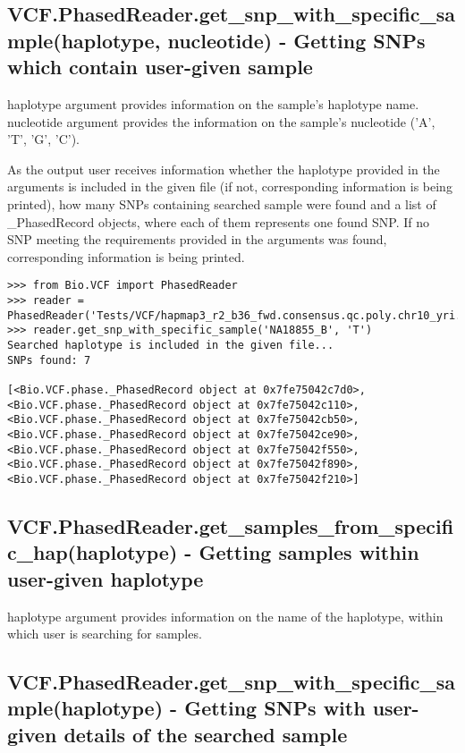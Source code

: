 \subsection{VCF.PhasedReader.get\_snp\_with\_specific\_sample(haplotype, nucleotide) - Getting SNPs which contain user-given sample}

\noindent haplotype argument provides information on the sample's haplotype name.
nucleotide argument provides the information on the sample's nucleotide ('A', 'T', 'G', 'C'). 

\noindent As the output user receives information whether the haplotype provided in the arguments is included in the given file (if not, corresponding information 
is being printed), how many SNPs containing searched sample were found and a list of \_PhasedRecord objects, where each of them represents one found SNP. If no SNP
meeting the requirements provided in the arguments was found, corresponding information is being printed. 

\begin{verbatim}
>>> from Bio.VCF import PhasedReader
>>> reader = PhasedReader('Tests/VCF/hapmap3_r2_b36_fwd.consensus.qc.poly.chr10_yri.D.phased')
>>> reader.get_snp_with_specific_sample('NA18855_B', 'T')
Searched haplotype is included in the given file...
SNPs found: 7

[<Bio.VCF.phase._PhasedRecord object at 0x7fe75042c7d0>, <Bio.VCF.phase._PhasedRecord object at 0x7fe75042c110>, <Bio.VCF.phase._PhasedRecord object at 0x7fe75042cb50>, <Bio.VCF.phase._PhasedRecord object at 0x7fe75042ce90>, <Bio.VCF.phase._PhasedRecord object at 0x7fe75042f550>, <Bio.VCF.phase._PhasedRecord object at 0x7fe75042f890>, <Bio.VCF.phase._PhasedRecord object at 0x7fe75042f210>]
\end{verbatim}

\subsection{VCF.PhasedReader.get\_samples\_from\_specific\_hap(haplotype) - Getting samples within user-given haplotype}

\noindent haplotype argument provides information on the name of the haplotype, within which user is searching for samples.

\subsection{VCF.PhasedReader.get\_snp\_with\_specific\_sample(haplotype) - Getting SNPs with user-given details of the searched sample}

